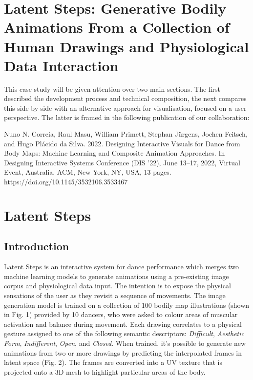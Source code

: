 \section{Latent Steps: Generative Bodily Animations From a Collection of Human Drawings and Physiological Data Interaction}
\label{case_studies:latent_steps}

This case study will be given attention over two main sections. The first described the development process and technical composition, the next compares this side-by-side with an alternative approach for visualisation, focused on a user perspective. The latter is framed in the following publication of our collaboration:

Nuno N. Correia, Raul Masu, William Primett, Stephan Jürgens, Jochen
Feitsch, and Hugo Plácido da Silva. 2022. Designing Interactive Visuals
for Dance from Body Maps: Machine Learning and Composite Animation
Approaches. In Designing Interactive Systems Conference (DIS ’22), June
13–17, 2022, Virtual Event, Australia. ACM, New York, NY, USA, 13 pages.
https://doi.org/10.1145/3532106.3533467

\printpublication{}

\section{Latent Steps}

\subsection{Introduction}

Latent Steps is an interactive system for dance performance which merges two machine learning models to generate animations using a pre-existing image corpus and physiological data input. The intention is to expose the physical sensations of the user as they revisit a sequence of movements.
The image generation model is trained on a collection of 100 bodily map illustrations (shown in Fig. 1) provided by 10 dancers, who were asked to colour areas of muscular activation and balance during movement. Each drawing correlates to a physical gesture assigned to one of the following semantic descriptors: \textit{Difficult}, \textit{Aesthetic Form}, \textit{Indifferent}, \textit{Open}, and \textit{Closed}. When trained, it’s possible to generate new animations from two or more drawings by predicting the interpolated frames in latent space (Fig. 2). The frames are converted into a UV texture that is projected onto a 3D mesh to highlight particular areas of the body.

